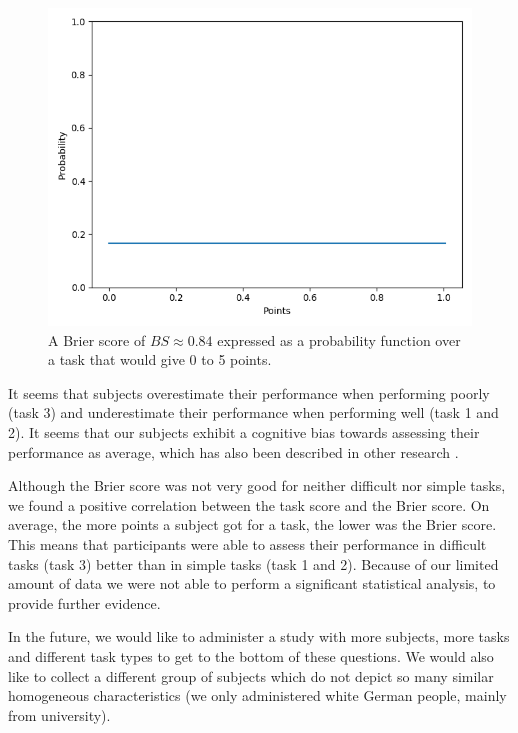 \documentclass[../main/main.tex]{subfiles}
\begin{document}
	\begin{figure}[h]
		\centering
		\includegraphics[width=.5\textwidth]{../assets/brier_plot.png}
		\caption{A Brier score of $BS \approx 0.84$ expressed as a probability function over a task that would give 0 to 5 points.}
		\label{fig:briers}
	\end{figure}

	It seems that subjects overestimate their performance when performing poorly (task 3) and underestimate their performance when performing well (task 1 and 2). It seems that our subjects exhibit a cognitive bias towards assessing their performance as average, which has also been described in other research \cite{kruger1999unskilled}.

	Although the Brier score was not very good for neither difficult nor simple tasks, we found a positive correlation between the task score and the Brier score. On average, the more points a subject got for a task, the lower was the Brier score. This means that participants were able to assess their performance in difficult tasks (task 3) better than in simple tasks (task 1 and 2). Because of our limited amount of data we were not able to perform a significant statistical analysis, to provide further evidence.
	
	In the future, we would like to administer a study with more subjects, more tasks and different task types to get to the bottom of these questions. We would also like to collect a different group of subjects which do not depict so many similar homogeneous characteristics (we only administered white German people, mainly from university).
	
	
	
	
\end{document}
